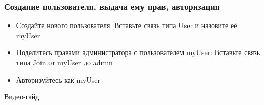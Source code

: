 \subsubsection{Создание пользователя, выдача ему прав, авторизация}
\begin{itemize}
  \item Создайте нового пользователя: \hyperlink{DeepCase.InsertLink.Description}{Вставьте} связь типа \hyperlink{Core.User.Description}{User} и \hyperlink{FAQ.HowToSetName}{назовите} её myUser
  \item Поделитесь правами администратора с пользователем myUser: \hyperlink{DeepCase.InsertLink.Description}{Вставьте} связь типа \hyperlink{Core.Join.Description}{Join} от myUser до admin
  \item Авторизуйтесь как myUser
\end{itemize}
\href{https://youtu.be/TeGln__84y8}{Видео-гайд}


